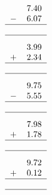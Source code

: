 \documentclass[leqno, 12pt]{article}
\begin{document}
\begin{multicols}{3}
\vspace{-1pt}%
\begin{equation}
    \raisebox{-0.8cm}{
        \begin{tabular}{c S[table-format=1.2]}
         &7.40 \tabularnewline
        $-$&6.07 \tabularnewline
        \hline
         & \tabularnewline
        \hline
    \end{tabular}}
\end{equation}
\vspace{-1pt}%
\begin{equation}
    \raisebox{-0.8cm}{
        \begin{tabular}{c S[table-format=1.2]}
         &3.99 \tabularnewline
        $+$&2.34 \tabularnewline
        \hline
         & \tabularnewline
        \hline
    \end{tabular}}
\end{equation}
\vspace{-1pt}%
\begin{equation}
    \raisebox{-0.8cm}{
        \begin{tabular}{c S[table-format=1.2]}
         &9.75 \tabularnewline
        $-$&5.55 \tabularnewline
        \hline
         & \tabularnewline
        \hline
    \end{tabular}}
\end{equation}
\vspace{-1pt}\columnbreak  %
\begin{equation}
    \raisebox{-0.8cm}{
        \begin{tabular}{c S[table-format=1.2]}
         &7.98 \tabularnewline
        $+$&1.78 \tabularnewline
        \hline
         & \tabularnewline
        \hline
    \end{tabular}}
\end{equation}
\vspace{-1pt}%
\begin{equation}
    \raisebox{-0.8cm}{
        \begin{tabular}{c S[table-format=1.2]}
         &9.72 \tabularnewline
        $+$&0.12 \tabularnewline
        \hline
         & \tabularnewline
        \hline
    \end{tabular}}
\end{equation}
\vspace{-1pt}%
\begin{equation}
    \raisebox{-0.8cm}{
        \begin{tabular}{c S[table-format=1.2]}

\end{tabular}}
\end{equation}
\end{multicols}
\end{document}
